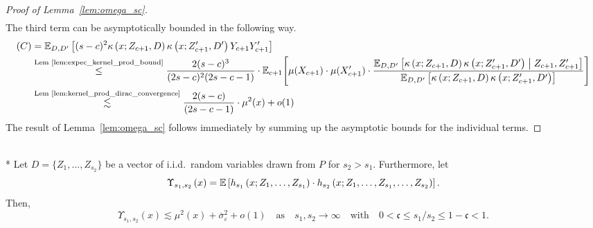 \begin{proof}[Proof of Lemma~\ref{lem:omega_sc}]
\begin{equation}
\begin{aligned}
		\end{aligned}
	\end{equation}
	The third term can be asymptotically bounded in the following way.
	\begin{equation}
		\begin{aligned}
			(C)
            & = \mathbb{E}_{D, D^{\prime}}\left[(s-c)^2 \kappa\left(x; Z_{c+1}, D\right)\kappa\left(x; Z_{c+1}^{\prime}, D^{\prime}\right)Y_{c+1}Y_{c+1}^{\prime}\right]                                           \\
			& \overset{\text{Lem \ref{lem:expec_kernel_prod_bound}}}{\leq} \frac{2(s-c)^{3}}{(2s-c)^{2}(2s-c-1)}
            \cdot \mathbb{E}_{c+1}\Bigg[
                \mu(X_{c+1}) \cdot \mu(X_{c+1}^{\prime}) \cdot \frac{\mathbb{E}_{D, D^{\prime}}\left[\kappa\left(x; Z_{c+1}, D\right)\kappa\left(x; Z_{c+1}^{\prime}, D^{\prime}\right) \; \middle| \; Z_{c+1}, Z_{c+1}^{\prime}\right]}{\mathbb{E}_{D, D^{\prime}}\left[\kappa\left(x; Z_{c+1}, D\right)\kappa\left(x; Z_{c+1}^{\prime}, D^{\prime}\right)\right]}
            \Bigg]\\
			& \overset{\text{Lem \ref{lem:kernel_prod_dirac_convergence}}}{\lesssim}
            \frac{2(s-c)}{(2s-c-1)} \cdot \mu^2(x) + o(1)
		\end{aligned}
	\end{equation}
	The result of Lemma~\ref{lem:omega_sc} follows immediately by summing up the asymptotic bounds for the individual terms.
\end{proof}

\begin{boxD}
    \begin{lem}\label{lem:upsilon_s}\mbox{}\\*
	Let $D = \{Z_1, \dotsc, Z_{s_2}\}$ be a vector of i.i.d.\ random variables drawn from $P$ for $s_2 > s_1$.
	Furthermore, let
	\begin{equation}
		\Upsilon_{s_1, s_2}\left(x\right)
		= \mathbb{E}\left[h_{s_1}\left(x; Z_1, \ldots,  Z_{s_1}\right) \cdot
			h_{s_2}\left(x; Z_1, \ldots,Z_{s_1}, \ldots, Z_{s_2}\right)\right].
	\end{equation}
	Then,
	\begin{equation}
		\Upsilon_{s_1, s_2}\left(x\right)
		\lesssim \mu^{2}\left(x\right) + \overline{\sigma}^2_{\varepsilon} + o(1)
		\quad \text{as} \quad s_1, s_2 \rightarrow \infty
		\quad \text{with} \quad
		0 < \mathfrak{c} \leq s_1 / s_2 \leq 1 - \mathfrak{c} < 1.
	\end{equation}
\end{lem}
\end{boxD}

